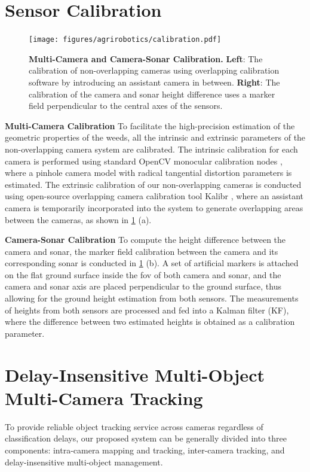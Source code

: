 \section{Sensor Calibration}

\begin{figure}[t]
    \centering
    \texttt{[image: figures/agrirobotics/calibration.pdf]}
    \caption[Multi-Camera and Camera-Sonar Calibration]{\textbf{Multi-Camera and Camera-Sonar Calibration.} \textbf{Left}: The calibration of non-overlapping cameras using overlapping calibration software by introducing an assistant camera in between. \textbf{Right}: The calibration of the camera and sonar height difference uses a marker field perpendicular to the central axes of the sensors.
	\label{fig:agrirobotics_calibration}}
\end{figure}

\noindent \textbf{Multi-Camera Calibration} 
To facilitate the high-precision estimation of the geometric properties of the weeds, all the intrinsic and extrinsic parameters of the non-overlapping camera system are calibrated. 
The intrinsic calibration for each camera is performed using standard OpenCV monocular calibration nodes \cite{bradski2000opencv}, where a pinhole camera model with radical tangential distortion parameters is estimated. 
The extrinsic calibration of our non-overlapping cameras is conducted using open-source overlapping camera calibration tool Kalibr \cite{furgale2013unified}, where an assistant camera is temporarily incorporated into the system to generate overlapping areas between the cameras, as shown in \ref{fig:agrirobotics_calibration} (a).

\textbf{Camera-Sonar Calibration} To compute the height difference between the camera and sonar, the marker field calibration \cite{siltanen2007automatic} between the camera and its corresponding sonar is conducted in \ref{fig:agrirobotics_calibration} (b). 
A set of artificial markers is attached on the flat ground surface inside the \acrshort{fov} of both camera and sonar, and the camera and sonar axis are placed perpendicular to the ground surface, thus allowing for the ground height estimation from both sensors. 
The measurements of heights from both sensors are processed and fed into a Kalman filter (KF), where the difference between two estimated heights is obtained as a calibration parameter. 

\section{Delay-Insensitive Multi-Object Multi-Camera Tracking} 
To provide reliable object tracking service across cameras regardless of classification delays, our proposed system can be generally divided into three components: intra-camera mapping and tracking, inter-camera tracking, and delay-insensitive multi-object management. 

